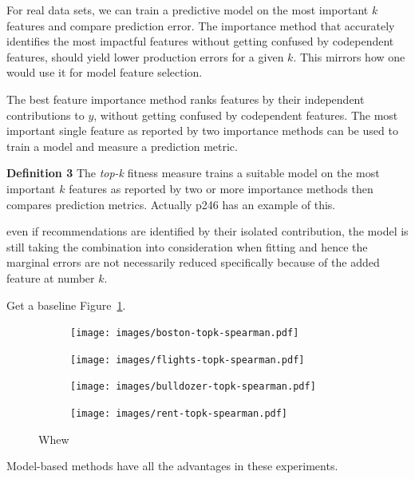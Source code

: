 \documentclass[12pt]{article}
\newcommand{\figref}[1]{Figure~\ref{#1}}
\begin{document}
For real data sets, we can train a predictive model on the most important $k$ features and compare prediction error. The importance method that accurately identifies the most impactful features without getting confused by codependent features, should yield lower production errors for a given $k$.   This mirrors how one would use it for model feature selection.
 
The best feature importance method ranks features by their independent contributions to $y$, without getting confused by codependent features. The most important single feature as reported by two importance methods can be used to train a model and measure a prediction metric.
 
{\bf Definition 3} The {\em top-k} fitness measure trains a suitable model on the  most important $k$ features as reported by two or more importance methods then compares prediction metrics. Actually p246 \cite{liu-fs} has an example of this.

even if recommendations are identified by their isolated contribution, the model is still taking the combination into consideration when fitting and hence the marginal errors are not necessarily reduced specifically because of the added feature at number $k$.

Get a baseline \figref{fig:baseline}.

\begin{figure}[b]
\centering
\begin{subfigure}{.24\textwidth}
    \centering
\texttt{[image: images/boston-topk-spearman.pdf]}
\end{subfigure}%
\hfill
\begin{subfigure}{.24\textwidth}
    \centering
\texttt{[image: images/flights-topk-spearman.pdf]}
\end{subfigure}
\hfill
\begin{subfigure}{.24\textwidth}
    \centering
\texttt{[image: images/bulldozer-topk-spearman.pdf]}
\end{subfigure}
\hfill
\begin{subfigure}{.24\textwidth}
    \centering
\texttt{[image: images/rent-topk-spearman.pdf]}
\end{subfigure}
\caption{Whew}
\label{fig:baseline}
\end{figure}

Model-based methods have all the advantages in these experiments.
\end{document}
